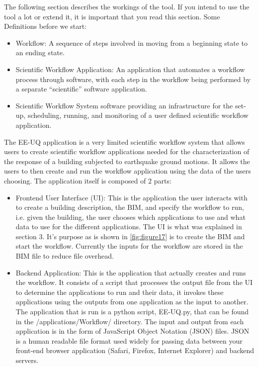The following section describes the workings of the tool. If you intend to use the tool a lot or extend it, 
it is important that you read this section.
Some Definitions before we start:
\begin{itemize}
\item Workflow: A sequence of steps involved in moving from a beginning state to an ending state.
\item Scientific Workflow Application: An application that automates a workflow process through software, with each step in the 
workflow being performed by a separate “scientific” software application.
\item Scientific Workflow System software providing an infrastructure for the set-up, scheduling, running, and monitoring of a 
user defined scientific workflow application. 
\end{itemize}

The EE-UQ application is a very limited scientific workflow system that allows users to create scientific workflow applications needed 
for the characterization of the response of a building subjected to earthquake ground motions. It allows the users to then create and run 
the workflow application using the data of the users choosing. The application itself is composed of 2 parts:

\begin{itemize}
\item	Frontend User Interface (UI): This is the application the user interacts with to create a building description, the BIM, and specify 
the workflow to run, i.e. given the building, the user chooses which applications to use and what data to use for the different applications. 
The UI is what was explained in section 3. It’s purpose as is shown in \autoref{fig:figure17} is to create the BIM and start the workflow. 
Currently the inputs for the workflow are stored in the BIM file to reduce file overhead.
\item	Backend Application: This is the application that actually creates and runs the workflow. It consists of a script that processes the 
output file from the UI to determine the applications to run and their data, it invokes these applications using the outputs from one 
application as the input to another. The application that is run is a python script, EE-UQ.py, that can be found in the /applications/Workflow/ directory. 
The input and output from each application is in the form of JavaScript Object Notation (JSON) files. JSON is a human readable file format used 
widely for passing data between your front-end browser application (Safari, Firefox, Internet Explorer) and backend servers.
\end{itemize}



